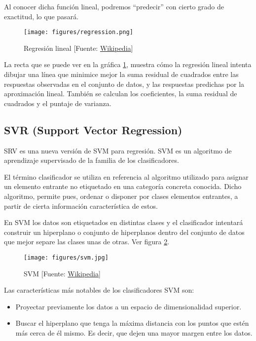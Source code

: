 	Al conocer dicha función lineal, podremos ``predecir'' con cierto grado de exactitud, lo que pasará.

	\begin{figure}[htb]
		\begin{center}
			\texttt{[image: figures/regression.png]}
			\caption{Regresión lineal [Fuente: \href{www.wikipedia.org}{Wikipedia}] \label{regression}}
		\end{center}
	\end{figure}
	
	La recta que se puede ver en la gráfica \ref{regression}, muestra cómo la regresión lineal intenta dibujar una línea que minimice mejor la suma residual de cuadrados entre las respuestas observadas en el conjunto de datos, y las respuestas predichas por la aproximación lineal.
	También se calculan los coeficientes, la suma residual de cuadrados y el puntaje de varianza.

	\subsection{SVR (Support Vector Regression)}
	\label{makereference4.3.2}

	SRV es una nueva versión de SVM para regresión. SVM es un algoritmo de aprendizaje supervisado de la familia de los clasificadores.

	El término clasificador se utiliza en referencia al algoritmo utilizado para asignar un elemento entrante no etiquetado en una categoría concreta conocida. Dicho algoritmo, permite pues, ordenar o disponer por clases elementos entrantes, a partir de cierta información característica de estos.

	En SVM los datos son etiquetados en distintas clases y el clasificador intentará construir un hiperplano o conjunto de hiperplanos dentro del conjunto de datos que mejor separe las clases unas de otras. Ver figura \ref{svm}.

	\begin{figure}[htb]
		\begin{center}
			\texttt{[image: figures/svm.jpg]}
			\caption{SVM [Fuente: \href{www.wikipedia.org}{Wikipedia}] \label{svm}}
		\end{center}
	\end{figure}

	Las características más notables de los clasificadores SVM son:
	\begin{itemize}
		\item Proyectar previamente los datos a un espacio de dimensionalidad superior.
		\item Buscar el hiperplano que tenga la máxima distancia con los puntos que estén más cerca de él mismo. Es decir, que dejen una mayor margen entre los datos.
	\end{itemize}

